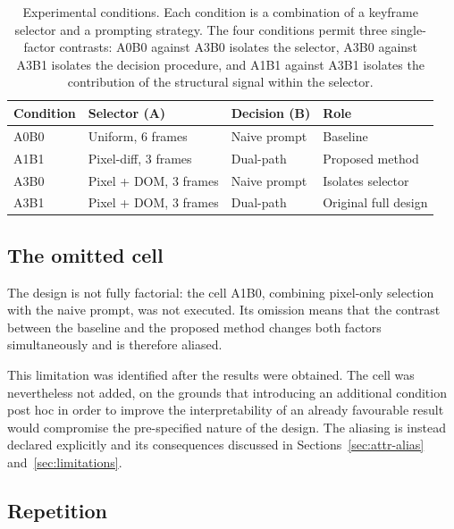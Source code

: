 \begin{table}[htbp]
\centering
\caption{Experimental conditions. Each condition is a combination of a
keyframe selector and a prompting strategy. The four conditions permit
three single-factor contrasts: A0B0 against A3B0 isolates the selector,
A3B0 against A3B1 isolates the decision procedure, and A1B1 against A3B1
isolates the contribution of the structural signal within the selector.}
\label{tab:conditions}
\small
\begin{tabular}{@{}llll@{}}
\toprule
Condition & Selector (A) & Decision (B) & Role \\
\midrule
A0B0 & Uniform, 6 frames    & Naive prompt & Baseline \\
A1B1 & Pixel-diff, 3 frames & Dual-path    & Proposed method \\
A3B0 & Pixel + DOM, 3 frames & Naive prompt & Isolates selector \\
A3B1 & Pixel + DOM, 3 frames & Dual-path    & Original full design \\
\bottomrule
\end{tabular}
\end{table}

\subsection{The omitted cell}
\label{sec:omitted}

The design is not fully factorial: the cell A1B0, combining pixel-only
selection with the naive prompt, was not executed. Its omission means that
the contrast between the baseline and the proposed method changes both
factors simultaneously and is therefore aliased.

This limitation was identified after the results were obtained. The cell
was nevertheless not added, on the grounds that introducing an additional
condition post hoc in order to improve the interpretability of an already
favourable result would compromise the pre-specified nature of the design.
The aliasing is instead declared explicitly and its consequences discussed
in Sections~\ref{sec:attr-alias} and~\ref{sec:limitations}.

\subsection{Repetition}

